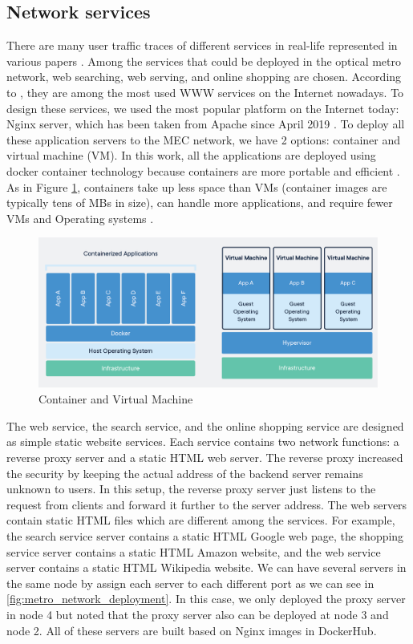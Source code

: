 \documentclass[conference]{IEEEtran}
\begin{document}
\subsection{Network services}
There are many user traffic traces of different services in real-life represented in various papers \cite{International2017, 7469991, Shi2016}. Among the services that could be deployed in the optical metro network, web searching, web serving, and online shopping are chosen. According to \cite{International2017}, they are among the most used WWW services on the Internet nowadays. To design these services, we used the most popular platform on the Internet today: Nginx server, which has been taken from Apache since April 2019 \cite{netcraft_news_2021}. To deploy all these application servers to the MEC network, we have 2 options: container and virtual machine (VM). In this work, all the applications are deployed using docker container technology because containers are more portable and efficient \cite{7036275}. As in Figure \ref{fig:container_img}, containers take up less space than VMs (container images are typically tens of MBs in size), can handle more applications, and require fewer VMs and Operating systems \cite{docker}.

\begin{figure}[]
    \centering
    \includegraphics[scale = 0.25]{imgs/container-VM.png}
    \caption{Container and Virtual Machine}
    \label{fig:container_img}
\end{figure}

The web service, the search service, and the online shopping service are designed as simple static website services. Each service contains two network functions: a reverse proxy server and a static HTML web server. The reverse proxy increased the security by keeping the actual address of the backend server remains unknown to users. In this setup, the reverse proxy server just listens to the request from clients and forward it further to the server address. The web servers contain static HTML files which are different among the services. For example, the search service server contains a static HTML Google web page, the shopping service server contains a static HTML Amazon website, and the web service server contains a static HTML Wikipedia website. We can have several servers in the same node by assign each server to each different port as we can see in \ref{fig:metro_network_deployment}. In this case, we only deployed the proxy server in node 4 but noted that the proxy server also can be deployed at node 3 and node 2. All of these servers are built based on Nginx images in DockerHub.  
\end{document}

